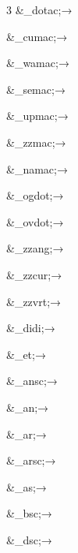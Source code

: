 \begin{multicols}{3}
\color{RViolet}%
\&{\textcompwordmark}\_dotac;\hfill→\hfill{}

\&{\textcompwordmark}\_cumac;\hfill→\hfill{}

\&{\textcompwordmark}\_wamac;\hfill→\hfill{}

\&{\textcompwordmark}\_semac;\hfill→\hfill{}

\&{\textcompwordmark}\_upmac;\hfill→\hfill{}

\&{\textcompwordmark}\_zzmac;\hfill→\hfill{}

\&{\textcompwordmark}\_namac;\hfill→\hfill{}

\&{\textcompwordmark}\_ogdot;\hfill→\hfill{}

\&{\textcompwordmark}\_ovdot;\hfill→\hfill{}

\&{\textcompwordmark}\_zzang;\hfill→\hfill{}

\&{\textcompwordmark}\_zzcur;\hfill→\hfill{}

\&{\textcompwordmark}\_zzvrt;\hfill→\hfill{}

\&{\textcompwordmark}\_didi;\hfill→\hfill{}

\&{\textcompwordmark}\_et;\hfill→\hfill{}

\&{\textcompwordmark}\_ansc;\hfill→\hfill{}

\&{\textcompwordmark}\_an;\hfill→\hfill{}

\&{\textcompwordmark}\_ar;\hfill→\hfill{}

\&{\textcompwordmark}\_arsc;\hfill→\hfill{}

\&\_{\textcompwordmark}as;\hfill→\hfill{}

\&{\textcompwordmark}\_bsc;\hfill→\hfill{}

\&{\textcompwordmark}\_dsc;\hfill→\hfill{}


\end{multicols}
